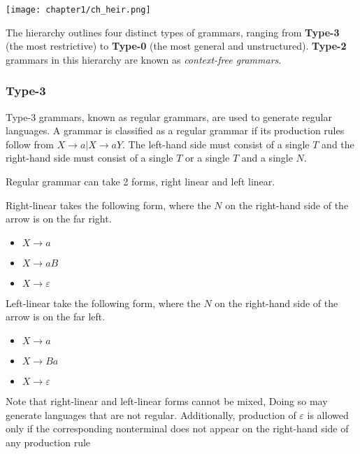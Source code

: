 \begin{center}
    \texttt{[image: chapter1/ch\_heir.png]}
    \label{fig:hierarchy}
\end{center}

The hierarchy outlines four distinct types of grammars, ranging from \textbf{Type-3} (the most restrictive) to \textbf{Type-0} (the most general and unstructured). \textbf{Type-2} grammars in this hierarchy are known as \emph{context-free grammars}.

\subsubsection{Type-3}
Type-3 grammars, known as regular grammars, are used to generate regular languages. A grammar is classified as a regular grammar if its production rules follow from $X \rightarrow a | X \rightarrow aY$. The left-hand side must consist of a single $T$ and the right-hand side must consist of a single $T$ or a single $T$ and a single $N$.

Regular grammar can take 2 forms, right linear and left linear.

Right-linear takes the following form, where the $N$ on the right-hand side of the arrow is on the far right.
\begin{itemize}
    \item[] $X \rightarrow a$
    \item[] $X \rightarrow aB$
    \item[] $X \rightarrow \varepsilon$
\end{itemize}

Left-linear take the following form, where the $N$ on the right-hand side of the arrow is on the far left.
\begin{itemize}
    \item[] $X \rightarrow a$
    \item[] $X \rightarrow Ba$
    \item[] $X \rightarrow \varepsilon$
\end{itemize}

Note that right-linear and left-linear forms cannot be mixed, 
Doing so may generate languages that are not regular. 
Additionally, production of $\varepsilon$ is allowed only if the corresponding nonterminal 
does not appear on the right-hand side of any production rule \cite{hendriksConsiderItParsed,shiIntelligenceScience2021}

